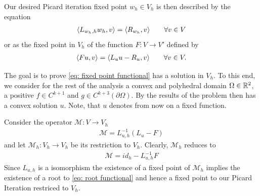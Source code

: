 Our desired Picard iteration fixed point $w_h \in V_h$ is then described by the equation
\begin{align}
	 \langle L_{w_h, h} w_h, v \rangle =   \langle R_{w_h}, v \rangle   \qquad \forall v \in V \label{eq: fixed point functional}
\end{align}
or as the fixed point in $V_h$ of the function $F:V \rightarrow V'$ defined by
\begin{align}
 \langle Fu, v \rangle =   \langle L_u u - R_u, v \rangle   \qquad \forall v \in V. \label{eq: root functional}
\end{align}

The goal is to prove \eqref{eq: fixed point functional} has a solution in $V_h$. To this end, we consider for the rest of the analysis a convex and polyhedral domain $\Omega\in \mathbb{R}^2$, a positive $f \in C^{k+1}$ and $g\in C^{k+3}(\partial \Omega)$. By the results of \cite{CNS1984} the \MA problem then has a convex solution $u$. Note, that $u$ denotes from now on a fixed function.

Consider the operator $\mathcal M: V \rightarrow V_h$
\begin{align}
	\mathcal M = L_{u,h}^{-1}(L_{u} - F)
\end{align}
and let $\mathcal M_h:V_h \rightarrow V_h$ be its restriction to $V_h$. Clearly, $\mathcal M_h$ reduces to 
\begin{align}
\mathcal M = id_h - L_{u,h}^{-1}F
\end{align}
Since $L_{u,h}$ is a isomorphism the existence of a fixed point of $\mathcal M_h$ implies the existence of a root to \eqref{eq: root functional} and hence a fixed point to our Picard Iteration restriced to $V_h$.

